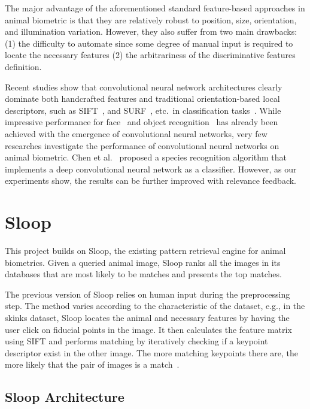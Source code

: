 The major advantage of the aforementioned standard feature-based approaches in
animal biometric is that they are relatively robust to position, size,
orientation, and illumination variation.  However, they also suffer from two
main drawbacks: (1) the difficulty to automate since some degree of manual input
is required to locate the necessary features (2) the arbitrariness of the
discriminative features definition.

Recent studies show that convolutional neural network architectures clearly
dominate both handcrafted features and traditional orientation-based local
descriptors, such as SIFT~\cite{lowe04}, and SURF~\cite{surf08}, etc.\ in
classification tasks~\cite{fisher14,kriz12,prelu15,ILSVRC15}. While impressive
performance for face~\cite{facerec97,deepface14} and object
recognition~\cite{kriz12,ILSVRC15} has already been achieved with the emergence
of convolutional neural networks, very few researches investigate the
performance of convolutional neural networks on animal biometric. Chen et
al.~\cite{animal14} proposed a species recognition algorithm that implements a
deep convolutional neural network as a classifier. However, as our experiments
show, the results can be further improved with relevance feedback.

\section{Sloop} %
\label{sec:sloop}

This project builds on Sloop, the existing pattern retrieval engine for animal
biometrics. Given a queried animal image, Sloop ranks all the images in its
databases that are most likely to be matches and presents the top matches.

The previous version of Sloop relies on human input during the preprocessing
step. The method varies according to the characteristic of the dataset, e.g., in
the skinks dataset, Sloop locates the animal and necessary features by having
the user click on fiducial points in the image. It then calculates the feature
matrix using SIFT and performs matching by iteratively checking if a keypoint
descriptor exist in the other image.  The more matching keypoints there are, the
more likely that the pair of images is a match~\cite{sloop15,sloop14,sloop13}.

\subsection{Sloop Architecture}

